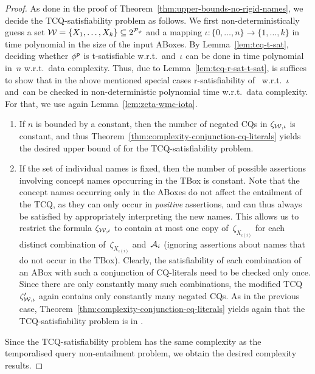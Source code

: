 \begin{proof}
    As done in the proof of Theorem~\ref{thm:upper-bounds-no-rigid-names}, we
    decide the TCQ-satisfiability problem as follows.  We first
    non-deterministically guess a set
    $\mathcal{W}=\{X_1,\dots,X_k\}\subseteq 2^{\mathcal{P}_\phi}$ and a mapping
    $\iota\colon\{0,\dots,n\}\to\{1,\dots,k\}$ in time polynomial in the size of
    the input ABoxes.
    By Lemma~\ref{lem:tcq-t-sat}, deciding whether $\phi^\mathsf{p}$ is t-satisfiable
    w.r.t.~\Wmc and~$\iota$ can be done in time polynomial in~$n$ w.r.t.\ data
    complexity.  Thus, due to Lemma~\ref{lem:tcq-r-sat-t-sat}, is suffices to
    show that in the above mentioned special cases r-satisfiability of~\Wmc
    w.r.t.~$\iota$ and~\Kmc can be checked in non-deterministic polynomial time
    w.r.t.\ data complexity.  For that, we use again
    Lemma~\ref{lem:zeta-wmc-iota}.
    \begin{enumerate}
        \item If $n$ is bounded by a constant, then the number of negated CQs
            in $\zeta_{\mathcal{W},\iota}$ is constant, and thus
            Theorem~\ref{thm:complexity-conjunction-cq-literals} yields the
            desired upper bound of \NP for the TCQ-satisfiability problem.
        \item If the set of individual names is fixed, then the number of
            possible assertions involving concept names opccurring in the TBox
            is constant.  Note that the concept names occurring only in the
            ABoxes do not affect the entailment of the TCQ, as they can only
            occur in \emph{positive} assertions, and can thus always be
            satisfied by appropriately interpreting the new names.
            This allows us to restrict the formula $\zeta_{\mathcal{W},\iota}$ to
            contain at most one copy of~$\zeta_{X_{\iota(i)}}$ for each distinct
            combination of~$\zeta_{X_{\iota(i)}}$ and~$\mathcal{A}_i$ (ignoring
            assertions about names that do not occur in the TBox).  Clearly, the
            satisfiability of each combination of an ABox with such a
            conjunction of CQ-literals need to be checked only once.  Since
            there are only constantly many such combinations, the modified TCQ
            $\zeta_{\mathcal{W},\iota}'$ again contains only constantly many negated
            CQs.  As in the previous case,
            Theorem~\ref{thm:complexity-conjunction-cq-literals} yields again
            that the TCQ-satisfiability problem is in \NP.
    \end{enumerate}
    Since the TCQ-satisfiability problem has the same complexity as the
    temporalised query non-entailment problem, we obtain the desired complexity
    results.
\end{proof}

